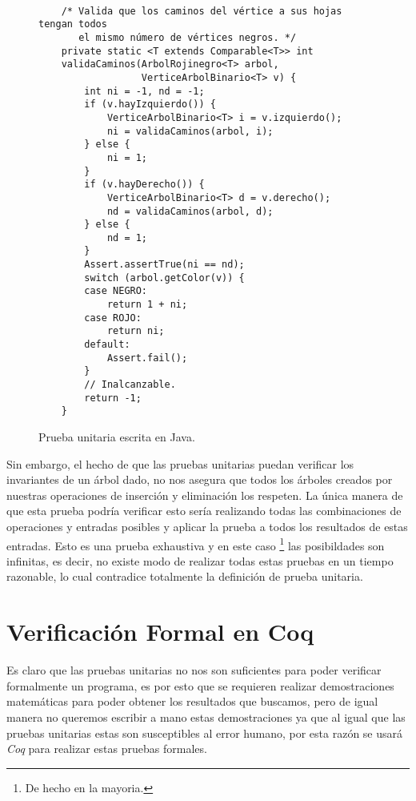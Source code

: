 \begin{figure}[!ht]
\centering
\captionsetup{justification=centering}
\begin{verbatim}

    /* Valida que los caminos del vértice a sus hojas tengan todos
       el mismo número de vértices negros. */
    private static <T extends Comparable<T>> int
    validaCaminos(ArbolRojinegro<T> arbol,
                  VerticeArbolBinario<T> v) {
        int ni = -1, nd = -1;
        if (v.hayIzquierdo()) {
            VerticeArbolBinario<T> i = v.izquierdo();
            ni = validaCaminos(arbol, i);
        } else {
            ni = 1;
        }
        if (v.hayDerecho()) {
            VerticeArbolBinario<T> d = v.derecho();
            nd = validaCaminos(arbol, d);
        } else {
            nd = 1;
        }
        Assert.assertTrue(ni == nd);
        switch (arbol.getColor(v)) {
        case NEGRO:
            return 1 + ni;
        case ROJO:
            return ni;
        default:
            Assert.fail();
        }
        // Inalcanzable.
        return -1;
    }

\end{verbatim}
\caption{Prueba unitaria escrita en Java.\cite{CanekPU}}
\label{unitTestjava}
\end{figure}

Sin embargo, el hecho de que las pruebas unitarias puedan verificar los invariantes de un \'arbol
dado, no nos asegura que todos los \'arboles creados por nuestras operaciones de inserci\'on y
eliminaci\'on los respeten. La \'unica manera de que esta prueba podr\'ia verificar esto ser\'ia
realizando todas las combinaciones de operaciones y entradas posibles y aplicar la prueba a todos los
resultados de estas entradas. Esto es una prueba exhaustiva y en este caso \footnote{De hecho en la
mayoria.} las posibildades son infinitas, es decir, no existe modo de realizar todas estas pruebas
en un tiempo razonable, lo cual contradice totalmente la definici\'on de prueba unitaria.


\section{Verificaci\'on Formal en Coq}

Es claro que las pruebas unitarias no nos son suficientes para poder verificar formalmente un
programa, es por esto que se requieren realizar demostraciones matemáticas para poder obtener los
resultados que buscamos, pero de igual manera no queremos escribir a mano estas demostraciones ya
que al igual que las pruebas unitarias estas son susceptibles al error humano, por esta raz\'on se
usar\'a \textit{Coq} para realizar estas pruebas formales.

